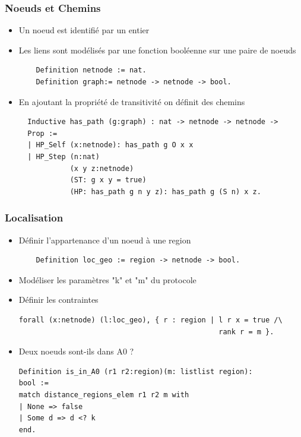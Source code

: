 \documentclass[handout]{beamer}
\begin{document}
\begin{frame}[fragile]
  \frametitle<1->{Noeuds et Chemins}
    \begin{itemize}
    \item <1->{Un noeud est identifié par un entier}
    \item <2->{Les liens sont modélisés par une fonction booléenne sur une paire de noeuds}
    \begin{lstlisting}
    Definition netnode := nat.
    Definition graph:= netnode -> netnode -> bool.
    \end{lstlisting}
    \item <3->{En ajoutant la propriété de transitivité on définit des chemins }
    \begin{lstlisting}
  Inductive has_path (g:graph) : nat -> netnode -> netnode -> 
  Prop :=
  | HP_Self (x:netnode): has_path g O x x 
  | HP_Step (n:nat) 
            (x y z:netnode) 
            (ST: g x y = true) 
            (HP: has_path g n y z): has_path g (S n) x z.
    \end{lstlisting}
    \end{itemize}
\end{frame}

\begin{frame}[fragile]
  \frametitle<1->{Localisation}
    \begin{itemize}
    \item <1->{Définir l'appartenance d'un noeud à une region}
    \begin{lstlisting}
    Definition loc_geo := region -> netnode -> bool.
    \end{lstlisting}
    \item <2->{Modéliser les paramètres "k" et "m" du protocole}
    \item <3->{Définir les contraintes}%
    \begin{lstlisting}
forall (x:netnode) (l:loc_geo), { r : region | l r x = true /\ 
                                               rank r = m }.
    \end{lstlisting}%
    \item <3->{Deux noeuds sont-ils dans A0 ?}
    \begin{lstlisting}
Definition is_in_A0 (r1 r2:region)(m: listlist region): 
bool := 
match distance_regions_elem r1 r2 m with
| None => false
| Some d => d <? k
end.
    \end{lstlisting}    
    \end{itemize}
\end{frame}
\end{document}
